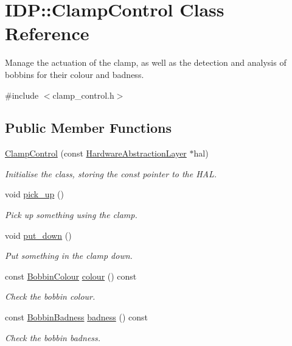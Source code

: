 \hypertarget{classIDP_1_1ClampControl}{
\section{IDP::ClampControl Class Reference}
\label{classIDP_1_1ClampControl}
}


Manage the actuation of the clamp, as well as the detection and analysis of bobbins for their colour and badness.  




{\ttfamily \#include $<$clamp\_\-control.h$>$}

\subsection*{Public Member Functions}
\begin{DoxyCompactItemize}
\item 
\hyperlink{classIDP_1_1ClampControl_a86666dd07720e41ba549edc9cc06d72a}{ClampControl} (const \hyperlink{classIDP_1_1HardwareAbstractionLayer}{HardwareAbstractionLayer} $\ast$hal)
\begin{DoxyCompactList}\small\item\em Initialise the class, storing the const pointer to the HAL. \item\end{DoxyCompactList}\item 
void \hyperlink{classIDP_1_1ClampControl_a881ecc4fbc73c47594ecc675b9dbf3e1}{pick\_\-up} ()
\begin{DoxyCompactList}\small\item\em Pick up something using the clamp. \item\end{DoxyCompactList}\item 
void \hyperlink{classIDP_1_1ClampControl_a31573846d9f7c61a6133b9dd465eca25}{put\_\-down} ()
\begin{DoxyCompactList}\small\item\em Put something in the clamp down. \item\end{DoxyCompactList}\item 
const \hyperlink{namespaceIDP_a6efd2cca14c0dae1c6458714ce0218df}{BobbinColour} \hyperlink{classIDP_1_1ClampControl_a99cb7006d4265ea369124786625281c9}{colour} () const 
\begin{DoxyCompactList}\small\item\em Check the bobbin colour. \item\end{DoxyCompactList}\item 
const \hyperlink{namespaceIDP_adf12b2c1e1c228810b18c34a3c88c32d}{BobbinBadness} \hyperlink{classIDP_1_1ClampControl_a6b829dbdee269f7fc3a99b2bd0bb379c}{badness} () const 
\begin{DoxyCompactList}\small\item\em Check the bobbin badness. \item\end{DoxyCompactList}\end{DoxyCompactItemize}


